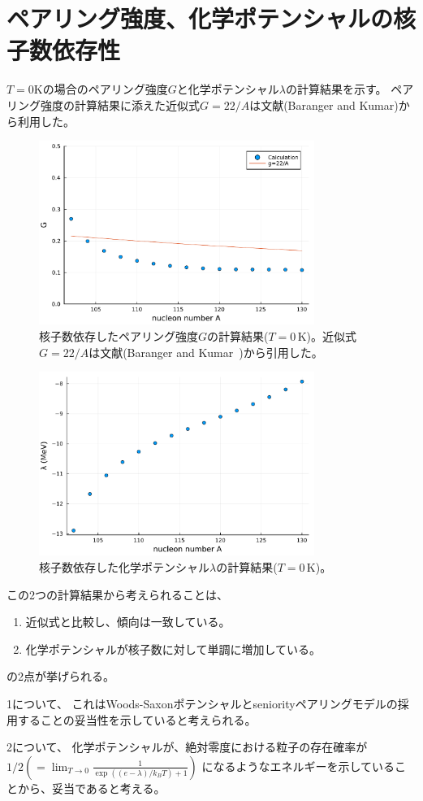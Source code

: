 \documentclass[a4paper]{jsreport}
\begin{document}
  \section{ペアリング強度、化学ポテンシャルの核子数依存性}
  \(T=0\)Kの場合のペアリング強度\(G\)と化学ポテンシャル\(\lambda\)の計算結果を示す。
  ペアリング強度の計算結果に添えた近似式\(G=22/A\)は文献(Baranger and Kumar\cite{baranger1968nuclear})から利用した。
  \begin{figure}[H]
    \centering
    \includegraphics[width=0.8\textwidth]{main_fig/G_vs_A.pdf}
    \caption{核子数依存したペアリング強度$G$の計算結果($T=0$\,K)。近似式$G=22/A$は文献(Baranger and Kumar~\cite{baranger1968nuclear})から引用した。}
  \end{figure}
  \begin{figure}[H]
    \centering
    \includegraphics[width=0.8\textwidth]{main_fig/lambda_vs_A.pdf}
    \caption{核子数依存した化学ポテンシャル$\lambda$の計算結果($T=0$\,K)。}
  \end{figure}
  この2つの計算結果から考えられることは、
  \begin{enumerate}
    \item 近似式と比較し、傾向は一致している。
    \item 化学ポテンシャルが核子数に対して単調に増加している。
  \end{enumerate}
  の2点が挙げられる。\par
  1について、
  これはWoods-Saxonポテンシャルとseniorityペアリングモデルの採用することの妥当性を示していると考えられる。\par
  2について、
  化学ポテンシャルが、絶対零度における粒子の存在確率が\(1/2(=\lim_{T\rightarrow0}\frac{1}{\exp((e-\lambda)/k_B T)+1})\)
  になるようなエネルギーを示していることから、妥当であると考える。
\end{document}
